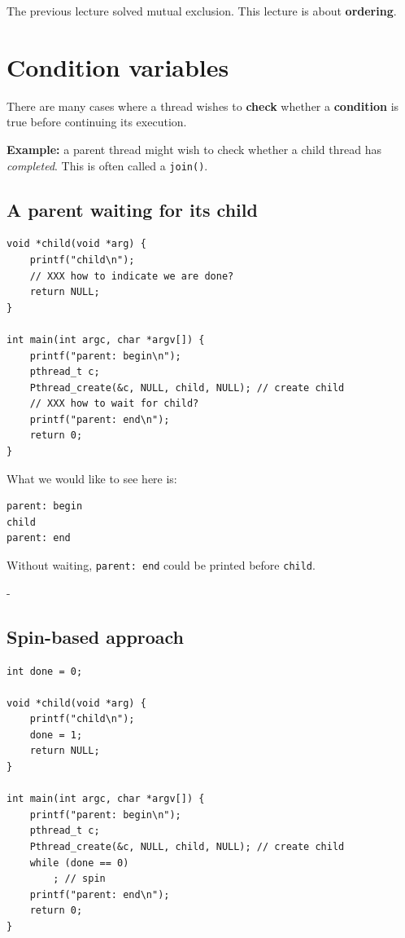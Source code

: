 \documentclass[11pt,a4paper]{article}
\makeatletter
\newcommand{\keepspace}[1]{\par\penalty-100\begingroup
  \setlength{\dimen@}{#1}\dimen@ii\pagegoal\advance\dimen@ii-\pagetotal
  \ifdim\dimen@>\dimen@ii\ifdim\dimen@ii>\z@\vfil\fi\break\fi\endgroup}
\makeatother
\begin{document}
The previous lecture solved mutual exclusion. This lecture is about
\textbf{ordering}.

\section{Condition variables}

There are many cases where a thread wishes to \textbf{check} whether a
\textbf{condition} is true before continuing its execution.

\textbf{Example:} a parent thread might wish to check whether a child
thread has \emph{completed}. This is often called a \texttt{join()}.

\subsection{A parent waiting for its child}

\begin{lstlisting}
void *child(void *arg) {
    printf("child\n");
    // XXX how to indicate we are done?
    return NULL;
}

int main(int argc, char *argv[]) {
    printf("parent: begin\n");
    pthread_t c;
    Pthread_create(&c, NULL, child, NULL); // create child
    // XXX how to wait for child?
    printf("parent: end\n");
    return 0;
}
\end{lstlisting}

What we would like to see here is:
\begin{lstlisting}[style=term]
parent: begin
child
parent: end
\end{lstlisting}

Without waiting, \texttt{parent: end} could be printed before
\texttt{child}.

\keepspace{22\baselineskip}
\subsection{Spin-based approach}

\begin{lstlisting}
int done = 0;

void *child(void *arg) {
    printf("child\n");
    done = 1;
    return NULL;
}

int main(int argc, char *argv[]) {
    printf("parent: begin\n");
    pthread_t c;
    Pthread_create(&c, NULL, child, NULL); // create child
    while (done == 0)
        ; // spin
    printf("parent: end\n");
    return 0;
}
\end{lstlisting}
\end{document}
